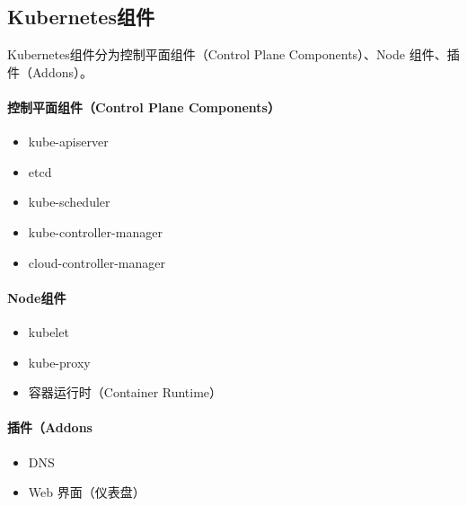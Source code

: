 \documentclass[../../../interview-questions.tex]{subfiles}
\begin{document}
\subsection{Kubernetes组件}

Kubernetes组件分为控制平面组件（Control Plane Components）、Node 组件、插件（Addons）。

\paragraph{控制平面组件（Control Plane Components） }

\begin{itemize}
    \item {kube-apiserver}
    \item {etcd}
    \item {kube-scheduler}
    \item {kube-controller-manager}
    \item {cloud-controller-manager}
\end{itemize}


\paragraph{Node组件}

\begin{itemize}
    \item {kubelet}
    \item {kube-proxy}
    \item {容器运行时（Container Runtime）}
\end{itemize}


\paragraph{插件（Addons}

\begin{itemize}
    \item {DNS}
    \item {Web 界面（仪表盘）}
\end{itemize}
\end{document}
